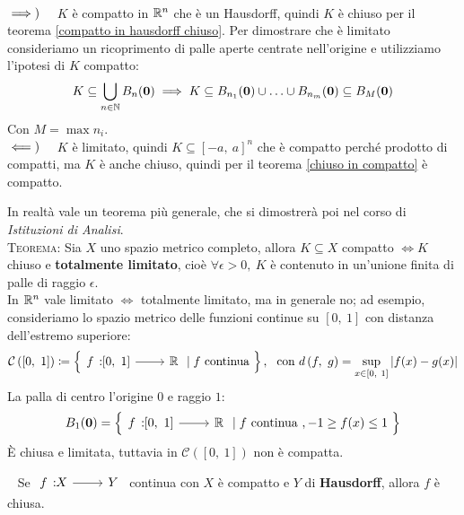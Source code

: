 \begin{demonstration}~{}\\
	$\implies)\quad$ $K$ è compatto in $\mathbb{R}^n$ che è un Hausdorff, quindi $K$ è chiuso per il teorema \ref{compatto in hausdorff chiuso}. Per dimostrare che è limitato consideriamo un ricoprimento di palle aperte centrate nell'origine e utilizziamo l'ipotesi di $K$ compatto:
		\begin{gather*}
			K\subseteq \bigcup_{n\in\mathbb{N}} B_n(\mathbf{0}) \implies K\subseteq B_{n_1}(\mathbf{0})\cup\ldots\cup B_{n_m}(\mathbf{0}) \subseteq B_M (\mathbf{0})
		\end{gather*}
	Con $M=\max n_i$.\\
	$\impliedby)\quad$ $K$ è limitato, quindi $K\subseteq [-a,\ a]^n$ che è compatto perché prodotto di compatti, ma $K$ è anche chiuso, quindi per il teorema \ref{chiuso in compatto} è compatto.
\end{demonstration}
\begin{digression}
In realtà vale un teorema più generale, che si dimostrerà poi nel corso di \textit{Istituzioni di Analisi}.\\
\textsc{Teorema:} Sia $X$ uno spazio metrico completo, allora $K\subseteq X$ compatto $\iff K$ chiuso e \textbf{totalmente limitato}, cioè $\forall\epsilon >0, \ K$ è contenuto in un'unione finita di palle di raggio $\epsilon$.\\
In $\mathbb{R}^n$ vale limitato $\iff$ totalmente limitato, ma in generale no; ad esempio, consideriamo lo spazio metrico delle funzioni continue su $[0,\ 1]$ con distanza dell'estremo superiore:
	\begin{gather*}
		\mathcal{C}\left( [0, \ 1] \right) \coloneqq \left\{ \funz f {[0,\ 1]} \realset \mid f \text{ continua } \right\},  \ \ \text{con } \mvf{d}{f}{g} =\sup_{x\in [0, \ 1]} |f(x)-g(x)|
	\end{gather*}
La palla di centro l'origine $0$ e raggio $1$:
\begin{equation*}
	B_1(\mathbf{0})=\left\{ \funz f {[0,\ 1]} \realset \mid f \text{ continua }, -1\geq f(x) \leq 1 \ \right\}
\end{equation*}
È chiusa e limitata, tuttavia in $\mathcal{C}\left( [0, \ 1] \right)$ non è compatta.
\end{digression}
\begin{theorema}~{}\label{da compatto in T_2 è chiuso}
Se $\funz f X Y$ continua con $X$ è compatto e $Y$ di \textbf{Hausdorff}, allora $f$ è chiusa.
\end{theorema}
